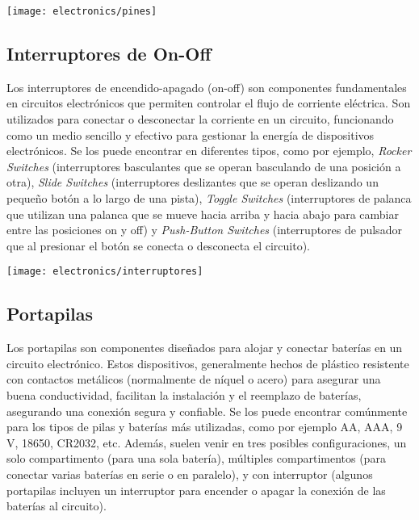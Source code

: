 \begin{center}
  \centering
  \texttt{[image: electronics/pines]}
  \label{fig:pines}
\end{center}

\subsection{Interruptores de On-Off}
Los interruptores de encendido-apagado (on-off) son componentes fundamentales en circuitos electrónicos que permiten controlar el flujo de corriente eléctrica. Son utilizados para conectar o desconectar la corriente en un circuito, funcionando como un medio sencillo y efectivo para gestionar la energía de dispositivos electrónicos. Se los puede encontrar en diferentes tipos, como por ejemplo, \textit{Rocker Switches} (interruptores basculantes que se operan basculando de una posición a otra), \textit{Slide Switches} (interruptores deslizantes que se operan deslizando un pequeño botón a lo largo de una pista), \textit{Toggle Switches} (interruptores de palanca que utilizan una palanca que se mueve hacia arriba y hacia abajo para cambiar entre las posiciones on y off) y \textit{Push-Button Switches} (interruptores de pulsador que al presionar el botón se conecta o desconecta el circuito).

\begin{center}
  \centering
  \texttt{[image: electronics/interruptores]}
  \label{fig:interruptores}
\end{center}

\subsection{Portapilas}

Los portapilas son componentes diseñados para alojar y conectar baterías en un circuito electrónico. Estos dispositivos, generalmente hechos de plástico resistente con contactos metálicos (normalmente de níquel o acero) para asegurar una buena conductividad, facilitan la instalación y el reemplazo de baterías, asegurando una conexión segura y confiable. Se los puede encontrar comúnmente para los tipos de pilas y baterías más utilizadas, como por ejemplo AA, AAA, 9 V, 18650, CR2032, etc. Además, suelen venir en tres posibles configuraciones, un solo compartimento (para una sola batería), múltiples compartimentos (para conectar varias baterías en serie o en paralelo), y con interruptor (algunos portapilas incluyen un interruptor para encender o apagar la conexión de las baterías al circuito).

